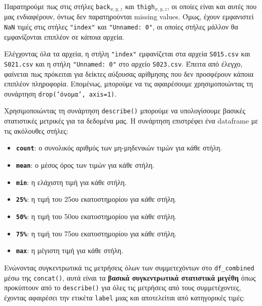         Παρατηρούμε πως στις στήλες \texttt{back}\(_{x,y,z}\) και \texttt{thigh}\(_{x,y,z}\), οι οποίες είναι και αυτές που μας ενδιαφέρουν, όντως δεν παρατηρούνται missing values.
        Όμως, έχουν εμφανιστεί \texttt{NaN} τιμές στις στήλες \texttt{"index"} και \texttt{"Unnamed: 0"}, οι οποίες στήλες μάλλον θα εμφανίζονται επιπλέον σε κάποια αρχεία.

        Ελέγχοντας όλα τα αρχεία, η στήλη \texttt{"index"} εμφανίζεται στα αρχεία \texttt{S015.csv} και \texttt{S021.csv} και η στήλη \texttt{"Unnamed: 0"} στο αρχείο \texttt{S023.csv}.
        Έπειτα από έλεγχο, φαίνεται πως πρόκειται για δείκτες αύξουσας αρίθμησης που δεν προσφέρουν κάποια επιπλέον πληροφορία.
        Επομένως, μπορούμε να τις αφαιρέσουμε χρησιμοποιώντας τη συνάρτηση \texttt{drop('όνομα', axis=1)}.

        Χρησιμοποιώντας τη συνάρτηση \texttt{describe()} μπορούμε να υπολογίσουμε βασικές στατιστικές μετρικές για τα δεδομένα μας.
        Η συνάρτηση επιστρέφει ένα dataframe με τις ακόλουθες στήλες:

        \vspace{-3mm}
        \begin{itemize}[label={\tiny \blacksquare}]
            \addtolength\itemsep{-3mm}
            \item \texttt{\textbf{count}}: ο συνολικός αριθμός των μη-μηδενικών τιμών για κάθε στήλη.
            \item \texttt{\textbf{mean}}: ο μέσος όρος των τιμών για κάθε στήλη.
            \item \texttt{\textbf{min}}: η ελάχιστη τιμή για κάθε στήλη.
            \item \texttt{\textbf{25\%}}: η τιμή του 25ου εκατοστημορίου για κάθε στήλη.
            \item \texttt{\textbf{50\%}}: η τιμή του 50ου εκατοστημορίου για κάθε στήλη.
            \item \texttt{\textbf{75\%}}: η τιμή του 75ου εκατοστημορίου για κάθε στήλη.
            \item \texttt{\textbf{max}}: η μέγιστη τιμή για κάθε στήλη.
        \end{itemize}

        Ενώνοντας συγκεντρωτικά τις μετρήσεις όλων των συμμετεχόντων στο \texttt{df\_combined} μέσω της \texttt{concat()},
        αυτά είναι τα \textbf{βασικά συγκεντρωτικά στατιστικά μεγέθη} όπως προκύπτουν από το \texttt{describe()}
        για όλες τις μετρήσεις από τους συμμετέχοντες, έχοντας αφαιρέσει την ετικέτα \texttt{label} μιας και αποτελείται από κατηγορικές τιμές:

